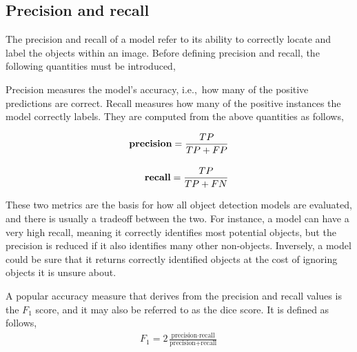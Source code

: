 \subsection{Precision and recall}
The precision and recall of a model refer to its ability to correctly locate and label the objects within an image.
Before defining precision and recall, the following quantities must be introduced,

\begin{center}
  {\setlength{\fboxsep}{1em}
  }
\end{center}

Precision measures the model's accuracy, i.e.,~how many of the positive predictions are correct.
Recall measures how many of the positive instances the model correctly labels.
They are computed from the above quantities as follows,

\begin{align*}
  \text{\bf precision}=\frac{TP}{TP+FP}\\[1em]
  \text{\bf recall}=\frac{TP}{TP+FN}
\end{align*}

These two metrics are the basis for how all object detection models are evaluated, and there is usually a tradeoff between the two.
For instance, a model can have a very high recall, meaning it correctly identifies most potential objects, but the precision is reduced if it also identifies many other non-objects.
Inversely, a model could be sure that it returns correctly identified objects at the cost of ignoring objects it is unsure about.

A popular accuracy measure that derives from the precision and recall values is the \(F_1\) score, and it may also be referred to as the dice score.
It is defined as follows,
%
\begin{align*}
  F_1=2\frac{\text{precision}\cdot\text{recall}}{\text{precision}+\text{recall}}
\end{align*}

